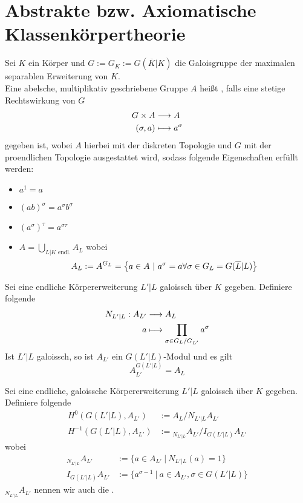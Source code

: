\documentclass{book}
\renewcommand{\i}{^{-1}}
\begin{document}
\newpage
\section{Abstrakte bzw. Axiomatische Klassenkörpertheorie}
Sei $K$ ein Körper und $G := G_K := G(\overline{K}|K)$ die Galoisgruppe der maximalen separablen Erweiterung von $K$.\\
Eine abelsche, multiplikativ geschriebene Gruppe $A$ heißt , falls eine stetige Rechtswirkung von $G$
\begin{align*}
G \times A & \overset{}{\longrightarrow} A\\
(\sigma, a) & \longmapsto a^\sigma
\end{align*}
gegeben ist, wobei $A$ hierbei mit der diskreten Topologie und $G$ mit der proendlichen Topologie ausgestattet wird, sodass folgende Eigenschaften erfüllt werden:
\begin{itemize}
\item $a^1 = a$
\item $(ab)^\sigma = a^\sigma b^\sigma$
\item $(a^\sigma)^\tau = a^{\sigma\tau}$
\item $A = \bigcup_{L|K \text{ endl.}}A_L$ wobei
\[A_L := A^{G_L} = \set{a\in A}{a^\sigma = a \forall \sigma \in G_L = G(\overline{L}|L)}\]
\end{itemize} 

Sei eine endliche Körpererweiterung $L'|L$ galoissch über $K$ gegeben. Definiere folgende 
\begin{align*}
N_{L'|L} : A_{L'} & \overset{}{\longrightarrow} A_L\\
a & \longmapsto \prod_{\sigma \in G_L/G_{L'}}a^\sigma
\end{align*}
Ist $L'|L$ galoissch, so ist $A_{L'}$ ein $G(L'|L)$-Modul und es gilt
\[ A_{L'}^{G(L'|L)}  = A_L \]

Sei eine endliche, galoissche Körpererweiterung $L'|L$ galoissch über $K$ gegeben. Definiere folgende 
\begin{align*}
H^0(G(L'|L), A_{L'} ) &:= A_L / N_{L'|L} A_{L'}\\
H\i (G(L'|L) , A_{L'}) &:= {}_{N_{L'|L}}A_{L'} / I_{G(L'|L)}A_{L'}
\end{align*}
wobei
\begin{align*}
{}_{N_{L'|L}}A_{L'} &:= \{a \in A_{L'}~|~N_{L'|L}(a) = 1\}\\
I_{G(L'|L)}A_{L'} &:= \{a^{\sigma - 1}~|~a \in A_{L'}, \sigma \in G(L'|L)\}
\end{align*}
${}_{N_{L'|L}}A_{L'}$ nennen wir auch die .
\end{document}
